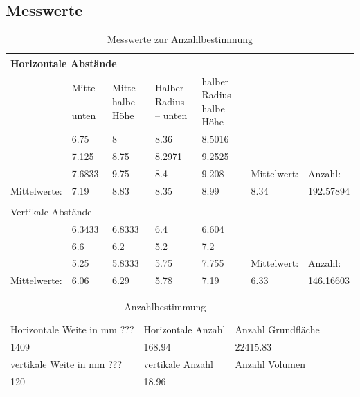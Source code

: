 \FloatBarrier
\pagebreak
\newpage
\begin{landscape}
\section{Messwerte}

\begin{table}[H]
\begin{tabular}{|l|llll|l|l|}
    \multicolumn{7}{l}{Horizontale Abstände}\\ \hline
     &Mitte – unten &Mitte - halbe Höhe &Halber Radius – unten &halber Radius - halbe Höhe & &\\ \hline
     &6.75 &8 &8.36 &8.5016 & &\\
     &7.125 &8.75 &8.2971 &9.2525 & &\\
     &7.6833 &9.75 &8.4 &9.208 &Mittelwert: &Anzahl:\\\hline
    Mittelwerte: &7.19 &8.83 &8.35 &8.99 &8.34 &192.57894\\\hline
    \multicolumn{7}{l}{}\\
    \multicolumn{7}{l}{Vertikale Abstände}\\ \hline
     &6.3433 &6.8333 &6.4 &6.604 & &\\
     &6.6 &6.2 &5.2 &7.2 & &\\
     &5.25 &5.8333 &5.75 &7.755 &Mittelwert: &Anzahl:\\\hline
    Mittelwerte: &6.06 &6.29 &5.78 &7.19 &6.33 &146.16603\\\hline
\end{tabular}
\caption{Messwerte zur Anzahlbestimmung}
\label{tab:mess-anz}
\end{table}

\begin{table}[H]
\begin{tabular}{|l|l|l|} \hline
Horizontale Weite in mm ???& Horizontale Anzahl & Anzahl Grundfläche \\
1409 & 168.94 & 22415.83 \\ \hline
vertikale Weite in mm ???& vertikale Anzahl & Anzahl Volumen \\ 
120 & 18.96 & \cellcolor[HTML]{C0C0C0}{\color[HTML]{FD6864} 425004} \\ \hline
\end{tabular}
\caption{Anzahlbestimmung}
\label{tab:anz}
\end{table}
\end{landscape}

\pagebreak
